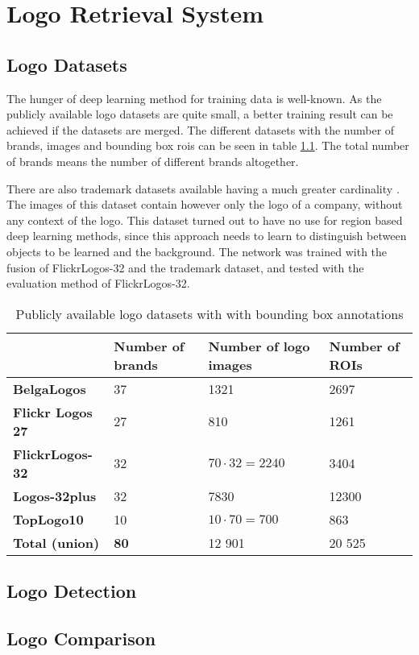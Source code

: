 \chapter{Logo Retrieval System}

\section{Logo Datasets}
The hunger of deep learning method for training data is well-known. As the publicly available logo datasets are quite small, a better training result can be achieved if the datasets are merged. The different datasets with the number of brands, images and bounding box rois can be seen in table \ref{table:logodatasets}. The total number of brands means the number of different brands altogether.

There are also trademark datasets available having a much greater cardinality \cite{DBLP:journals/corr/TursunAK17}. The images of this dataset contain however only the logo of a company, without any context of the logo. This dataset turned out to have no use for region based deep learning methods, since this approach needs to learn to distinguish between objects to be learned and the background. The network was trained with the fusion of FlickrLogos-32 and the trademark dataset, and tested with the evaluation method of FlickrLogos-32.
\begin{table}[ht!]
\centering
\caption{Publicly available logo datasets with with bounding box annotations}
\label{table:logodatasets}
\begin{tabular}{|l|l|l|l|}
\hline & \textbf{Number of brands} & \textbf{Number of logo images} & \textbf{Number of ROIs} \\
\hline
\textbf{BelgaLogos} & 37 & 1321 & 2697 \\
\hline
\textbf{Flickr Logos 27} & 27 & 810 & 1261 \\
\hline
\textbf{FlickrLogos-32} & 32 & $70 \cdot 32 = 2240$ & 3404 \\
\hline
\textbf{Logos-32plus} & 32 & 7830 & 12300 \\
\hline
\textbf{TopLogo10} & 10 & $10 \cdot 70 = 700$ & 863 \\
\hline\hline
\textbf{Total (union)} & \textbf{80} & 12 901 & 20 525 \\ \hline
\end{tabular}
\end{table}

\section{Logo Detection}

\section{Logo Comparison}
